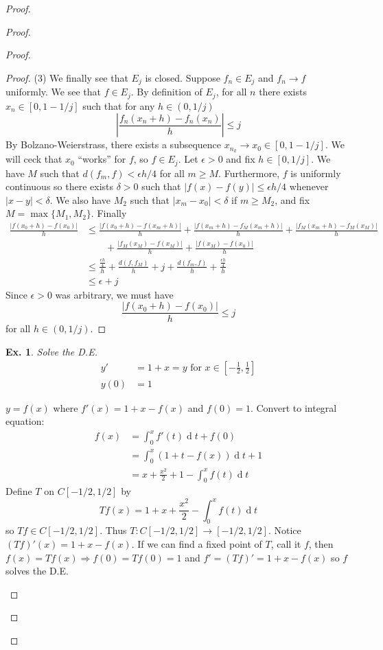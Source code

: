 \documentclass[12pt, a4paper]{book}
\renewcommand{\d}[1]{\ensuremath{\operatorname{d}\!{#1}}} %
\newtheorem{example}[theorem]{Ex.}
\theoremstyle{nonumberplain}
\newtheorem{proof}{Proof}
\begin{document}
\begin{proof}
\begin{proof}
\begin{proof}
\begin{proof}
    (3) We finally see that $E_j$ is closed.
    Suppose $f_n\in E_j$ and $f_n\to f$ uniformly.
    We see that $f\in E_j$.
    By definition of $E_j$, for all $n$ there exists $x_n\in[0,1-1/j]$ such that for any $h\in(0,1/j)$
    \[\left\lvert\frac{f_n(x_n+h)-f_n(x_n)}{h}\right\rvert\leq j\]
    By Bolzano-Weierstrass, there exists a subsequence $x_{n_k}\to x_0\in[0,1-1/j]$.
    We will ceck that $x_0$ ``works'' for $f$, so $f\in E_j$.
    Let $\epsilon>0$ and fix $h\in[0,1/j]$.
    We have $M$ such that $d(f_m,f)<\epsilon h/4$ for all $m\geq M$.
    Furthermore, $f$ is uniformly continuous so there exists $\delta>0$ such that $|f(x)-f(y)|\leq\epsilon h/4$ whenever $|x-y|<\delta$.
    We also have $M_2$ such that $|x_m-x_0|<\delta$ if $m\geq M_2$, and fix $M=\max\{M_1,M_2\}$.
    Finally
    \begin{align*}
        \frac{|f(x_0+h)-f(x_0)|}{h} &\leq \frac{|f(x_0+h)-f(x_m+h)|}{h}+\frac{|f(x_m+h)-f_M(x_m+h)|}{h}+\frac{|f_M(x_m+h)-f_M(x_M)|}{h}\\
                                    &\qquad+\frac{|f_M(x_M)-f(x_M)|}{h}+\frac{|f(x_M)-f(x_0)|}{h}\\
                                    &\leq \frac{\frac{\epsilon h}{4}}{h}+\frac{d(f,f_M)}{h}+j+\frac{d(f_m,f)}{h}+\frac{\frac{\epsilon h}{4}}{h}\\
                                    &\leq \epsilon+j
    \end{align*}
    Since $\epsilon>0$ was arbitrary, we must have
    \[\frac{|f(x_0+h)-f(x_0)|}{h}\leq j\]
    for all $h\in(0,1/j)$.
\end{proof}
\begin{example}
    Solve the D.E.
    \begin{align*}
        y' &= 1+x=y\text{ for } x\in\left[-\frac{1}{2},\frac{1}{2}\right]\\
        y(0) &= 1
    \end{align*}
\end{example}
\begin{solution}
    $y=f(x)$ where $f'(x)=1+x-f(x)$ and $f(0)=1$.
    Convert to integral equation:
    \begin{align*}
        f(x) &= \int_0^x f'(t)\d{t}+f(0)\\
             &= \int_0^x(1+t-f(x))\d{t}+1\\
             &= x+\frac{x^2}{2}+1-\int_0^x f(t)\d{t}
    \end{align*}
    Define $T$ on $C[-1/2,1/2]$ by
    \[Tf(x)=1+x+\frac{x^2}{2}-\int_0^x f(t)\d{t}\]
    so $Tf\in C[-1/2,1/2]$.
    Thus $T:C[-1/2,1/2]\to[-1/2,1/2]$.
    Notice $(Tf)'(x)=1+x-f(x)$.
    If we can find a fixed point of $T$, call it $f$, then $f(x)=Tf(x)\Rightarrow f(0)=Tf(0)=1$ and $f'=(Tf)'=1+x-f(x)$ so $f$ solves the D.E.


\end{solution}
\end{proof}
\end{proof}
\end{proof}
\end{document}

